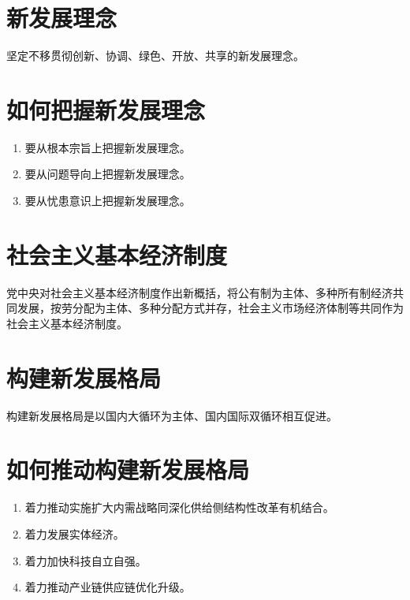 \documentclass[12pt, a4paper, oneside]{ctexbook}
\begin{document}
\section{新发展理念}

坚定不移贯彻创新、协调、绿色、开放、共享的新发展理念。

\section{如何把握新发展理念}

\begin{enumerate}
\item 要从根本宗旨上把握新发展理念。

\item 要从问题导向上把握新发展理念。

\item 要从忧患意识上把握新发展理念。
\end{enumerate}

\section{社会主义基本经济制度}

党中央对社会主义基本经济制度作出新概括，将公有制为主体、多种所有制经济共同发展，按劳分配为主体、多种分配方式并存，社会主义市场经济体制等共同作为社会主义基本经济制度。

\section{构建新发展格局}

构建新发展格局是以国内大循环为主体、国内国际双循环相互促进。

\section{如何推动构建新发展格局}

\begin{enumerate}
\item 着力推动实施扩大内需战略同深化供给侧结构性改革有机结合。

\item 着力发展实体经济。

\item 着力加快科技自立自强。

\item 着力推动产业链供应链优化升级。
\end{enumerate}
\end{document}
